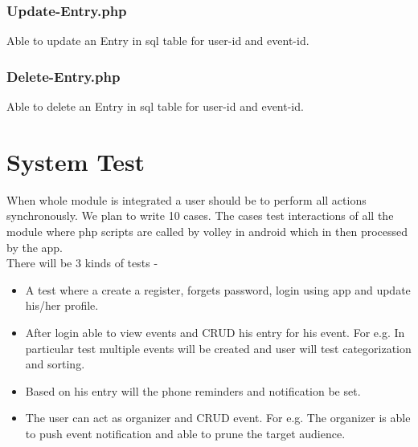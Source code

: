 \documentclass{article}
\begin{document}
\subsubsection{Update-Entry.php}
Able to update an Entry in sql table for user-id and event-id.
\subsubsection{Delete-Entry.php}
Able to delete an Entry in sql table for user-id and event-id.

\section{System Test}
When whole module is integrated a user should be to perform all actions synchronously.  We plan to write 10 cases. The cases test interactions of all the module where php scripts are called by volley in android which in then processed by the app.\\
There will be 3 kinds of tests -
\begin{itemize}
\item{A test where a create a register, forgets password, login using app and update his/her profile.}
\item{After login able to view events and CRUD his entry for his event. For e.g. In particular test multiple events will be created and user will test categorization and sorting.}
\item{Based on his entry will the phone reminders and notification be set.}
\item{The user can act as organizer and CRUD event. For e.g. The organizer is able to push event notification and able to prune the target audience.}
\end{itemize}
\end{document}

